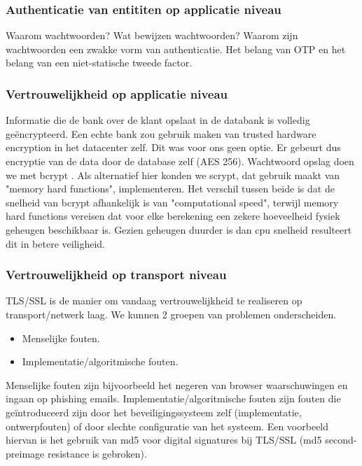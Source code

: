 \documentclass[11pt]{article}
\begin{document}
\subsubsection{Authenticatie van entititen op applicatie niveau}
Waarom wachtwoorden? Wat bewijzen wachtwoorden? Waarom zijn wachtwoorden een zwakke vorm van authenticatie. Het belang van OTP en het belang van een niet-statische tweede factor. \cite{death_of_clever}\cite{pw_habit}

\subsubsection{Vertrouwelijkheid op applicatie niveau}
Informatie die de bank over de klant opslaat in de databank is volledig ge\"encrypteerd. Een echte bank zou gebruik maken van trusted hardware encryption in het datacenter zelf. Dit was voor ons geen optie. Er gebeurt dus encryptie van de data door de database zelf (AES 256). Wachtwoord opslag doen we met bcrypt \cite{bcrypt}. Als alternatief hier konden we scrypt, dat gebruik maakt van "memory hard functions"\cite{scrypt}, implementeren. Het verschil tussen beide is dat de snelheid van bcrypt afhankelijk is van "computational speed", terwijl memory hard functions vereisen dat voor elke berekening een zekere hoeveelheid fysiek geheugen beschikbaar is. Gezien geheugen duurder is dan cpu snelheid resulteert dit in betere veiligheid.

\subsubsection{Vertrouwelijkheid op transport niveau}
TLS/SSL is de manier om vandaag vertrouwelijkheid te realiseren op transport/netwerk laag. We kunnen 2 groepen van problemen onderscheiden.

\begin{itemize}
\item Menselijke fouten.
\item Implementatie/algoritmische fouten.
\end{itemize}
Menselijke fouten zijn bijvoorbeeld het negeren van browser waarschuwingen en ingaan op phishing emails.
Implementatie/algoritmische fouten zijn fouten die ge\"introduceerd zijn door het beveiligingssysteem zelf (implementatie, ontwerpfouten) of door slechte configuratie van het systeem. Een voorbeeld hiervan is het gebruik van md5 voor digital signatures bij TLS/SSL (md5 second-preimage resistance is gebroken).
\end{document}
